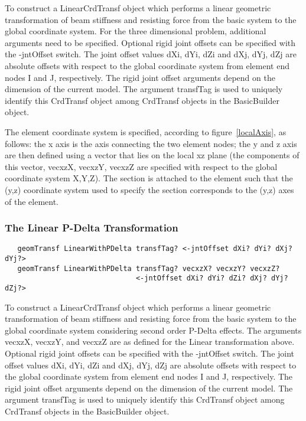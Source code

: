 \documentclass[12pt]{article}
\begin{document}
To construct a LinearCrdTransf object which performs a linear geometric
transformation of beam stiffness and resisting force from the basic system
to the global coordinate system. For the three dimensional problem,
additional arguments need to be specified. Optional rigid joint
offsets can be specified with the -jntOffset switch. The joint offset
values dXi, dYi, dZi and dXj, dYj, dZj are absolute offsets with
respect to the global coordinate system from element end nodes I and
J, respectively. The rigid joint offset arguments depend on the
dimension of the current model. The argument transfTag is used to
uniquely identify this CrdTransf object among CrdTransf objects in the
BasicBuilder object. 

The element coordinate system is specified, according to
figure~\ref{localAxis}, as follows: the x axis is the axis connecting
the two element nodes; the y and z axis are then defined using a
vector that lies on the local xz plane (the components of this vector,
vecxzX, vecxzY, vecxzZ are specified with respect to the global
coordinate system X,Y,Z). The section is attached to the element such
that the (y,z) coordinate system used to specify the section
corresponds to the (y,z) axes of the element. 



\subsubsection{The Linear P-Delta Transformation}
{\sf\small
\begin{verbatim}
   geomTransf LinearWithPDelta transfTag? <-jntOffset dXi? dYi? dXj? dYj?>
   geomTransf LinearWithPDelta transfTag? vecxzX? vecxzY? vecxzZ? 
                               <-jntOffset dXi? dYi? dZi? dXj? dYj? dZj?>
\end{verbatim}
}

To construct a LinearCrdTransf object which performs a linear geometric
transformation of beam stiffness and resisting force from the basic system
to the global coordinate system considering second order P-Delta
effects. The arguments vecxzX, vecxzY, and vecxzZ are as defined for
the Linear transformation above. Optional rigid joint offsets can be
specified with the -jntOffset switch. The joint offset values dXi,
dYi, dZi and dXj, dYj, dZj are absolute offsets with respect to the
global coordinate system from element end  nodes I and J,
respectively. The rigid joint offset arguments depend on the dimension
of the current model. The argument transfTag is used to uniquely
identify this CrdTransf object among CrdTransf objects in the BasicBuilder object.
\end{document}
